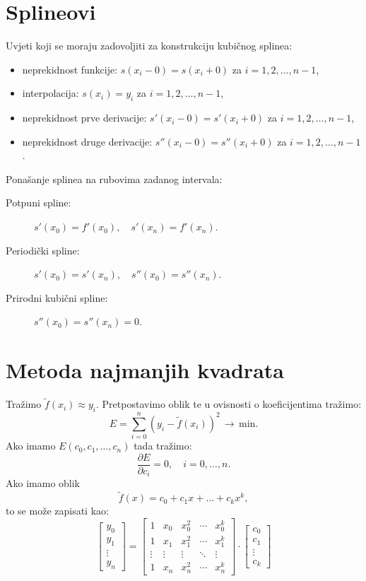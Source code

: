 \documentclass{article}
\begin{document}
\section{Splineovi}
Uvjeti koji se moraju zadovoljiti za konstrukciju kubičnog splinea:
\begin{itemize}
  \item neprekidnost funkcije: $s(x_i-0)=s(x_i+0)$ za $i=1,2,\ldots, n-1$,
  \item interpolacija: $s(x_i)=y_i$  za $i=1,2,\ldots, n-1$,
  \item neprekidnost prve derivacije: $s'(x_i-0)=s'(x_i+0)$ za $i=1,2,\ldots, n-1$,
  \item neprekidnost druge derivacije: $s''(x_i-0)=s''(x_i+0)$ za $i=1,2,\ldots, n-1$.
\end{itemize}
Ponašanje splinea na rubovima zadanog intervala:
\begin{description}
  \item[Potpuni spline:] $s'(x_0) = f'(x_0), \quad s'(x_n) = f'(x_n)$.
  \item[Periodički spline:] $s'(x_0) = s'(x_n), \quad s''(x_0) = s''(x_n)$.
  \item[Prirodni kubični spline:] $s''(x_0) = s''(x_n) = 0$.
\end{description}

\section{Metoda najmanjih kvadrata}
Tražimo $\tilde f(x_i) \approx y_i$. Pretpostavimo oblik te u ovisnosti o koeficijentima tražimo:
$$E = \sum\limits_{i=0}^n\left (y_i-\tilde f(x_i)\right)^2 \, \rightarrow \, \text{min}.$$
Ako imamo $E(c_0, c_1, \ldots, c_n)$ tada tražimo: $$\frac{\partial E}{\partial c_i} = 0,\quad i = 0, \ldots, n.$$
Ako imamo oblik
$$\tilde f(x) = c_0 + c_1x + \ldots + c_k x^k,$$
to se može zapisati kao:
$$\begin{bmatrix}
y_0\\
y_1\\
\vdots \\
y_n
\end{bmatrix}
=
\begin{bmatrix}
1 & x_0 & x_0^2 & \cdots & x_0^k\\
1 & x_1 & x_1^2 & \cdots & x_1^k\\
\vdots & \vdots & \vdots & \ddots & \vdots\\
1 & x_n & x_n^2 & \cdots & x_n^k
\end{bmatrix}
\cdot
\begin{bmatrix}
c_0\\
c_1\\
\vdots\\
c_k
\end{bmatrix}$$
\end{document}
